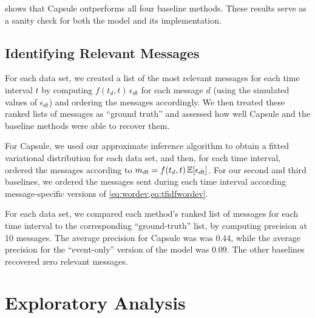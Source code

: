  shows that Capsule outperforms all four
baseline methods. These results serve as a sanity check for both the
model and its implementation.


\subsection{Identifying Relevant Messages}

For each data set, we created a list of the most relevant messages for
each time interval $t$ by computing $f(t_d, t)\,\epsilon_{dt}$ for
each message $d$ (using the simulated values of $\epsilon_{dt}$) and
ordering the messages accordingly. We then treated these ranked lists
of messages as ``ground truth'' and assessed how well Capsule and the
baseline methods were able to recover them.

For Capsule, we used our approximate inference algorithm to obtain a
fitted variational distribution for each data set, and then, for each
time interval, ordered the messages according to $m_{dt} = f(t_d,
t)\,\mathbb{E}[\epsilon_{dt}]$. For our second and third baselines, we ordered
the messages sent during each time interval according message-specific
versions of \cref{eq:wordev,eq:tfidfwordev}.

For each data set, we compared each method's ranked list of messages
for each time interval to the corresponding ``ground-truth'' list, by
computing precision at 10 messages. The average precision for Capsule
was was 0.44, while the average precision for the ``event-only''
version of the model was 0.09. The other baselines recovered zero
relevant messages.

\section{Exploratory Analysis}
\label{sec:eval}

